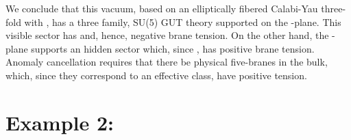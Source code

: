 \documentclass[a4paper,12pt]{article}
\numberwithin{equation}{section}
\theoremstyle{plain}
\begin{document}
We conclude that this vacuum, based on an elliptically fibered Calabi-Yau
three-fold with \coordHE{}, has a three family, SU(5) GUT theory supported on
the \coordHE{}-plane. This visible sector has \coordHE{} and, hence, negative
brane tension. On the other hand, the \coordHE{}-plane supports an \coordHE{} hidden sector
which, since \coordHE{}, has positive brane tension. Anomaly
cancellation requires that there be physical five-branes in the bulk, which,
since they correspond to an effective class, have positive tension.


\section*{Example 2: \coordHE{}}
\end{document}
